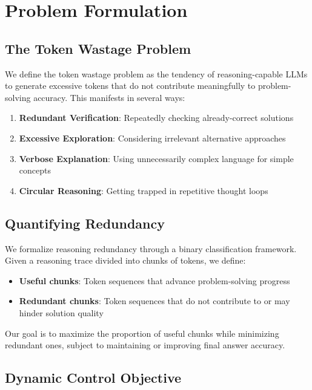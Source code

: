 \documentclass{article}
\begin{document}
\section{Problem Formulation}

\subsection{The Token Wastage Problem}

We define the token wastage problem as the tendency of reasoning-capable LLMs to generate excessive tokens that do not contribute meaningfully to problem-solving accuracy. This manifests in several ways:

\begin{enumerate}
\item \textbf{Redundant Verification}: Repeatedly checking already-correct solutions
\item \textbf{Excessive Exploration}: Considering irrelevant alternative approaches
\item \textbf{Verbose Explanation}: Using unnecessarily complex language for simple concepts
\item \textbf{Circular Reasoning}: Getting trapped in repetitive thought loops
\end{enumerate}

\subsection{Quantifying Redundancy}

We formalize reasoning redundancy through a binary classification framework. Given a reasoning trace divided into chunks of tokens, we define:

\begin{itemize}
\item \textbf{Useful chunks}: Token sequences that advance problem-solving progress
\item \textbf{Redundant chunks}: Token sequences that do not contribute to or may hinder solution quality
\end{itemize}

Our goal is to maximize the proportion of useful chunks while minimizing redundant ones, subject to maintaining or improving final answer accuracy.

\subsection{Dynamic Control Objective}
\end{document}
